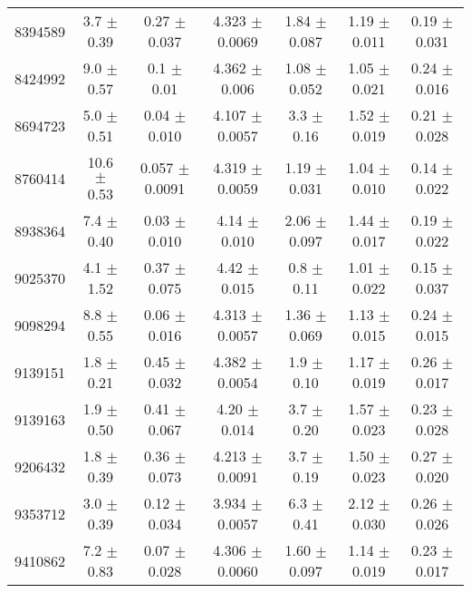 \documentclass[epjCONF,columns]{svjour} %
\begin{document}
\begin{table*}
\begin{tabular}{c|cccccc}
8394589  &        3.7    $\pm$  0.39   &      0.27   $\pm$  0.037  &      4.323  $\pm$  0.0069 &      1.84   $\pm$  0.087  &      1.19   $\pm$  0.011  &      0.19   $\pm$  0.031    \\
8424992  &        9.0    $\pm$  0.57   &      0.1    $\pm$  0.01   &      4.362  $\pm$  0.006  &      1.08   $\pm$  0.052  &      1.05   $\pm$  0.021  &      0.24   $\pm$  0.016    \\
8694723  &        5.0    $\pm$  0.51   &      0.04   $\pm$  0.010  &      4.107  $\pm$  0.0057 &      3.3    $\pm$  0.16   &      1.52   $\pm$  0.019  &      0.21   $\pm$  0.028    \\
8760414  &       10.6    $\pm$  0.53   &      0.057  $\pm$  0.0091 &      4.319  $\pm$  0.0059 &      1.19   $\pm$  0.031  &      1.04   $\pm$  0.010  &      0.14   $\pm$  0.022    \\
8938364  &        7.4    $\pm$  0.40   &      0.03   $\pm$  0.010  &      4.14   $\pm$  0.010  &      2.06   $\pm$  0.097  &      1.44   $\pm$  0.017  &      0.19   $\pm$  0.022    \\
9025370  &        4.1    $\pm$  1.52   &      0.37   $\pm$  0.075  &      4.42   $\pm$  0.015  &      0.8    $\pm$  0.11   &      1.01   $\pm$  0.022  &      0.15   $\pm$  0.037    \\
9098294  &        8.8    $\pm$  0.55   &      0.06   $\pm$  0.016  &      4.313  $\pm$  0.0057 &      1.36   $\pm$  0.069  &      1.13   $\pm$  0.015  &      0.24   $\pm$  0.015    \\
9139151  &        1.8    $\pm$  0.21   &      0.45   $\pm$  0.032  &      4.382  $\pm$  0.0054 &      1.9    $\pm$  0.10   &      1.17   $\pm$  0.019  &      0.26   $\pm$  0.017    \\
9139163  &        1.9    $\pm$  0.50   &      0.41   $\pm$  0.067  &      4.20   $\pm$  0.014  &      3.7    $\pm$  0.20   &      1.57   $\pm$  0.023  &      0.23   $\pm$  0.028    \\
9206432  &        1.8    $\pm$  0.39   &      0.36   $\pm$  0.073  &      4.213  $\pm$  0.0091 &      3.7    $\pm$  0.19   &      1.50   $\pm$  0.023  &      0.27   $\pm$  0.020    \\
9353712  &        3.0    $\pm$  0.39   &      0.12   $\pm$  0.034  &      3.934  $\pm$  0.0057 &      6.3    $\pm$  0.41   &      2.12   $\pm$  0.030  &      0.26   $\pm$  0.026    \\
9410862  &        7.2    $\pm$  0.83   &      0.07   $\pm$  0.028  &      4.306  $\pm$  0.0060 &      1.60   $\pm$  0.097  &      1.14   $\pm$  0.019  &      0.23   $\pm$  0.017    \\

\end{tabular}
\end{table*}
\end{document}
